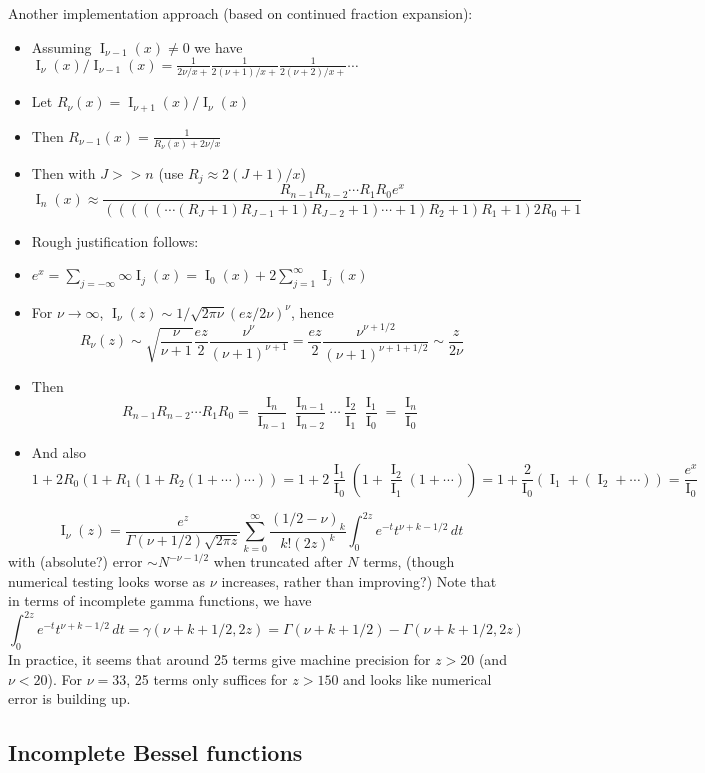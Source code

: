 \documentclass[10pt,dvipdfmx,letterpaper,twoside]{article}
\let\O=\operatorname
\let\gam=\gamma
\let\Gam=\Gamma
\begin{document}
Another implementation approach (based on continued fraction expansion):
\begin{itemize}
  \item Assuming $\O{I}_{\nu-1}(x)\neq0$ we have $\O{I}_\nu(x)/\O{I}_{\nu-1}(x) = \frac{1}{2\nu/x+} \frac{1}{2(\nu+1)/x+} \frac{1}{2(\nu+2)/x+}\cdots$
  \item Let $R_\nu(x) = \O{I}_{\nu+1}(x)/\O{I}_{\nu}(x)$
  \item Then $R_{\nu-1}(x) = \frac{1}{R_\nu(x)+2\nu/x}$
  \item Then with $J>>n$ (use $R_j\approx 2(J+1)/x$)
    \[ \O{I}_n(x) \approx \frac{R_{n-1}R_{n-2}\cdots R_1 R_0 e^x}{(((((\cdots(R_J+1)R_{J-1}+1)R_{J-2}+1)\cdots+1)R_2+1)R_1+1)2R_0+1} \]
  \item Rough justification follows:
  \item $e^x = \sum_{j=-\infty}{\infty} \O{I}_j(x) = \O{I}_0(x) + 2\sum_{j=1}^\infty \O{I}_j(x)$
  \item For $\nu\to\infty$, $\O{I}_\nu(z) \sim 1/\sqrt{2\pi\nu} (ez/2\nu)^\nu$, hence
    \[ R_\nu(z) \sim \sqrt{\frac{\nu}{\nu+1}}\frac{ez}{2} \frac{\nu^\nu}{(\nu+1)^{\nu+1}} = \frac{ez}{2}\frac{\nu^{\nu+1/2}}{(\nu+1)^{\nu+1+1/2}} \sim \frac{z}{2\nu} \]
  \item Then
    \[ R_{n-1}R_{n-2}\cdots R_1 R_0 = \frac{\O{I}_n}{\O{I}_{n-1}}\frac{\O{I}_{n-1}}{\O{I}_{n-2}}\cdots\frac{\O{I}_2}{\O{I}_1}\frac{\O{I}_1}{\O{I}_0}
        = \frac{\O{I}_n}{\O{I}_0} \]
  \item And also
    \[ 1+2R_0(1+R_1(1+R_2(1+\cdots)\cdots)) = 1+2\frac{\O{I}_1}{\O{I}_0}(1+\frac{\O{I}_2}{\O{I}_1}(1+\cdots)) = 1+\frac{2}{\O{I}_0}(\O{I}_1+(\O{I}_2+\cdots))
        = \frac{e^x}{\O{I}_0} \]
\end{itemize}

\[ \O{I}_\nu(z) = \frac{e^z}{\Gam(\nu+1/2)\sqrt{2\pi z}} \sum_{k=0}^\infty \frac{(1/2-\nu)_k}{k! (2z)^k}\int_0^{2z}e^{-t}t^{\nu+k-1/2}\,dt \]
with (absolute?) error $\sim N^{-\nu-1/2}$ when truncated after $N$ terms, (though numerical testing looks worse as $\nu$ increases, rather than improving?)
Note that in terms of incomplete gamma functions, we have
\[ \int_0^{2z}e^{-t}t^{\nu+k-1/2}\,dt = \gam(\nu+k+1/2, 2z) = \Gam(\nu+k+1/2) - \Gam(\nu+k+1/2,2z) \]
In practice, it seems that around 25 terms give machine precision for $z>20$ (and $\nu<20$).
For $\nu=33$, 25 terms only suffices for $z>150$ and looks like numerical error is building up.

\subsection{Incomplete Bessel functions}
\end{document}
